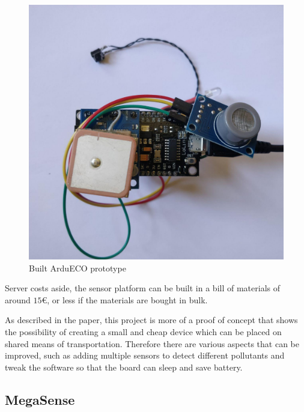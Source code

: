 			\noindent
			\begin{minipage}{0.50\textwidth}
				\begin{figure}[H]
					\centering
					\includegraphics[width=\textwidth]{resources/img/chap2/ardueco_picture}
					\caption{Built ArduECO prototype}
					\label{img:ardueco_picture}
				\end{figure}
			\end{minipage}%
			\hfill%
			\begin{minipage}{0.48\textwidth}\raggedright
				Server costs aside, the sensor platform can be built in a bill of materials of around $15$€, or less if the materials are bought in bulk.
				
				As described in the paper, this project is more of a proof of concept that shows the possibility of creating a small and cheap device which can be placed on shared means of transportation.
				Therefore there are various aspects that can be improved, such as adding multiple sensors to detect different pollutants and tweak the software so that the board can sleep and save battery.
			\end{minipage}

		\subsection{MegaSense}\label{subsec:megasense}
	
